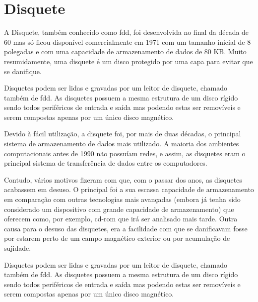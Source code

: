 \documentclass{report}
\begin{document}
\newpage

		\section{Disquete}
		A Disquete, também conhecido como \ac{fdd}, foi desenvolvida no final da década de 60 mas só ficou disponível comercialmente em 1971 com um tamanho inicial de 8 polegadas e com uma capacidade de armazenamento de dados de 80 KB. Muito resumidamente, uma disquete é um disco protegido por uma capa para evitar que se danifique. 
\vspace{1mm}

		Disquetes podem ser lidas e gravadas por um leitor de disquete, chamado também de \ac{fdd}. As disquetes possuem a mesma estrutura de um disco rígido sendo todos periféricos de entrada e saída mas podendo estas ser removíveis e serem compostas apenas por um único disco magnético.
\vspace{1mm}
		
		 Devido à fácil utilização, a disquete foi, por mais de duas décadas, o principal sistema de armazenamento de dados mais utilizado. A maioria dos ambientes computacionais antes de 1990 não possuíam redes, e assim, as disquetes eram o principal sistema de transferência de dados entre os computadores.
\vspace{1mm}
		
		Contudo, vários motivos fizeram com que, com o passar dos anos, as disquetes acabassem em desuso. O principal foi a sua escassa capacidade de armazenamento em comparação com outras tecnologias mais avançadas (embora já tenha sido considerado um dispositivo com grande capacidade de armazenamento) que oferecem como, por exemplo, \ac{cd-rom} que irá ser analisado mais tarde. Outra causa para o desuso das disquetes, era a facilidade com que se danificavam fosse por estarem perto de um campo magnético exterior ou por acumulação de sujidade.
\vspace{1mm}
	
		Disquetes podem ser lidas e gravadas por um leitor de disquete, chamado também de \ac{fdd}. As disquetes possuem a mesma estrutura de um disco rígido sendo todos periféricos de entrada e saída mas podendo estas ser removíveis e serem compostas apenas por um único disco magnético.
\vspace{1mm}
		
\end{document}
